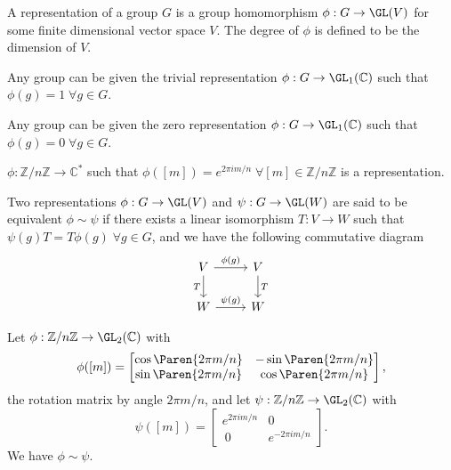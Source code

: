 \begin{defi}
	A representation of a group $G$ is a group homomorphism $\phi : G \to \GL(V)$ for some finite dimensional vector space $V$. The degree of $\phi$ is defined to be the dimension of $V$.
\end{defi}

\begin{defi}
	Any group can be given the trivial representation $\phi : G \to \GL_1(\mathbb{C})$ such that $\phi(g) = 1 \;\forall g \in G$. 
\end{defi}

\begin{defi}
	Any group can be given the zero representation $\phi : G \to \GL_1(\mathbb{C})$ such that $\phi(g) = 0 \; \forall g \in G$.
\end{defi}


\begin{exam}
	$\phi : \mathbb{Z}/n\mathbb{Z} \to \mathbb{C}^*$ such that $\phi([m]) = e^{2\pi i m/n} \;\forall [m] \in \mathbb{Z}/n\mathbb{Z}$ is a representation.
\end{exam}

\begin{defi}
	Two representations $\phi : G \to \GL(V)$ and $\psi : G \to \GL(W)$ are said to be equivalent $\phi \sim \psi$ if there exists a linear isomorphism $T : V \to W$ such that $\psi(g)T =T\phi(g)\;\forall g \in G$, and we have the following commutative diagram
	$$
	\begin{tikzcd}
		V \arrow{r}{\phi(g)} \arrow[swap]{d}{T} & V \arrow{d}{T} \\%
		W \arrow{r}{\psi(g)}&W 
	\end{tikzcd}
	$$
\end{defi}

\begin{exam}
	Let $\phi : \mathbb{Z}/n\mathbb{Z} \to \GL_2(\mathbb{C})$ with
	$$\phi([m]) = \begin{bmatrix}\cos\Paren{{2 \pi m}/{n}} & -\sin\Paren{{2 \pi m}/{n}}\\ \sin\Paren{{2 \pi m}/{n}} & \cos\Paren{{2 \pi m}/{n}}\end{bmatrix},$$
	the rotation matrix by angle $2\pi m/n$, and let $\psi : \mathbb{Z}/n\mathbb{Z} \to \GL_2(\mathbb{C})$ with
	$$\psi([m]) = \begin{bmatrix}e^{2 \pi i m/n} & 0 \\\ 0 & e^{-2 \pi i m/n}\end{bmatrix}.$$
	We have $\phi \sim \psi$.
\end{exam}

